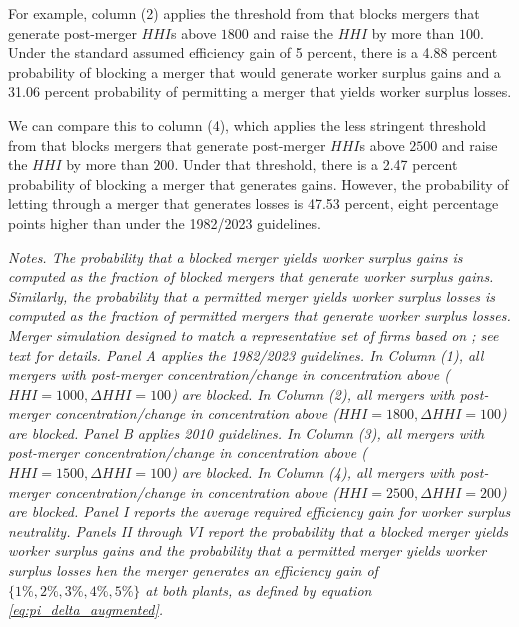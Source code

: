 \documentclass[12pt]{article}
\theoremstyle{prop}
\begin{document}
For example, column (2) applies the threshold from \cite{doj1982guidelines} that blocks mergers that generate post-merger $HHI$s above $1800$ and raise the $HHI$ by more than $100$. Under the standard assumed efficiency gain of 5 percent, there is a 4.88 percent probability of blocking a merger that would generate worker surplus gains and a 31.06 percent probability of permitting a merger that yields worker surplus losses. 

We can compare this to column (4), which applies the less stringent threshold from \cite{doj2010guidelines} that blocks mergers that generate post-merger $HHI$s above $2500$ and raise the $HHI$ by more than $200$. Under that threshold, there is a 2.47 percent probability of blocking a merger that generates gains. However, the probability of letting through a merger that generates losses is 47.53 percent, eight percentage points higher than under the 1982/2023 guidelines. 

\begin{table}[p!]
\centering
\resizebox{\textwidth}{!}{}
\caption{Type I and Type II error rates. \label{tab:merger_guidelines_errorrates}}
\begin{footnotesize}
\begin{flushleft}
 \textit{Notes. The probability that a blocked merger yields worker surplus gains is computed as the fraction of blocked mergers that generate worker surplus gains. Similarly, the probability that a permitted merger yields worker surplus losses is computed as the fraction of permitted mergers that generate worker surplus losses. Merger simulation designed to match a representative set of firms based on \citet{Arnold}; see text for details. Panel A applies the 1982/2023 guidelines. In Column (1), all mergers with post-merger concentration/change in concentration above ($HHI=1000, \Delta HHI=100$) are blocked.  In Column (2), all mergers with post-merger concentration/change in concentration above ($HHI=1800, \Delta HHI=100$) are blocked. Panel B applies 2010 guidelines. In Column (3), all mergers with post-merger concentration/change in concentration above ($HHI=1500, \Delta HHI=100$) are blocked.  In Column (4), all mergers with post-merger concentration/change in concentration above ($HHI=2500, \Delta HHI=200$) are blocked. Panel I  reports the average required efficiency gain for worker surplus neutrality. Panels II through VI report the probability that a blocked merger yields worker surplus gains and the probability that a permitted merger yields worker surplus losses hen the merger generates an
efficiency gain of $\{1\%,2\%,3\%,4\%,5\%\}$ at both plants, as defined by equation \eqref{eq:pi_delta_augmented}.  }   
 \end{flushleft}
\end{footnotesize}
\end{table}
\end{document}
